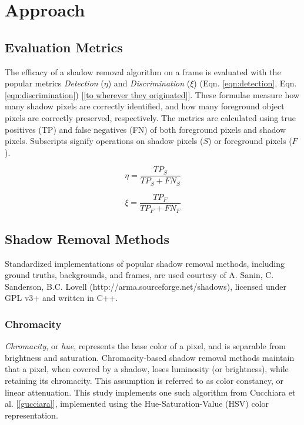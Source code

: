 \clearpage
\chapter{Approach}

\section{Evaluation Metrics} \label{section:eval_metrics}

The efficacy of a shadow removal algorithm on a frame is evaluated with the popular metrics \textit{Detection} ($\eta$) and \textit{Discrimination} ($\xi$) (Eqn. \ref{eqn:detection}, Eqn. \ref{eqn:discrimination}) [\ref{to wherever they originated}]. These formulae measure how many shadow pixels are correctly identified, and how many foreground object pixels are correctly preserved, respectively. The metrics are calculated using true positives (TP) and false negatives (FN) of both foreground pixels and shadow pixels. Subscripts signify operations on shadow pixels ($S$) or foreground pixels ($F$).

\begin{equation}
\eta = \dfrac{TP_{S}}{TP_{S} + FN_{S}} \label{eqn:detection}
\end{equation}

\begin{equation}
\xi = \dfrac{TP_{F}}{TP_{F} + FN_{F}} \label{eqn:discrimination}
\end{equation}

\section{Shadow Removal Methods} \label{section:removalmethods}

Standardized implementations of popular shadow removal methods, including ground truths, backgrounds, and frames, are used courtesy of A. Sanin, C. Sanderson, B.C. Lovell (http://arma.sourceforge.net/shadows), licensed under GPL v3+ and written in C++.

\subsection{Chromacity}

\textit{Chromacity}, or \textit{hue}, represents the base color of a pixel, and is separable from brightness and saturation. Chromacity-based shadow removal methods maintain that a pixel, when covered by a shadow, loses luminosity (or brightness), while retaining its chromacity. This assumption is referred to as  color constancy, or linear attenuation. This study implements one such algorithm from Cucchiara et al. [\ref{gucciara}], implemented using the Hue-Saturation-Value (HSV) color representation. 


